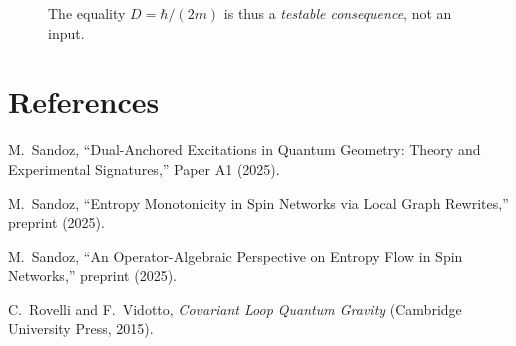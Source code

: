 \documentclass[11pt]{article}
\theoremstyle{plain}
\theoremstyle{definition}
\begin{document}
\begin{figure}[t]
  \centering
  \caption*{The equality $D=\hbar/(2m)$ is thus a \emph{testable consequence}, not an input.}
\end{figure}


\section*{References}
\begin{thebibliography}{99}

  M.~Sandoz,
  ``Dual-Anchored Excitations in Quantum Geometry: Theory and Experimental Signatures,''
  Paper A1 (2025).

  M.~Sandoz,
  ``Entropy Monotonicity in Spin Networks via Local Graph Rewrites,''
  preprint (2025).

  M.~Sandoz,
  ``An Operator-Algebraic Perspective on Entropy Flow in Spin Networks,''
  preprint (2025).

  C.~Rovelli and F.~Vidotto,
  \emph{Covariant Loop Quantum Gravity} (Cambridge University Press, 2015).

\end{thebibliography}
\end{document}
